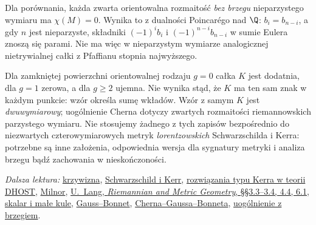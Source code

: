Dla porównania, każda zwarta orientowalna rozmaitość
\emph{bez brzegu} nieparzystego wymiaru ma $\chi(M)=0$.
Wynika to z dualności Poincarégo nad $\Q$:
$b_i=b_{n-i}$, a gdy $n$ jest nieparzyste,
składniki $(-1)^i b_i$ i $(-1)^{n-i}b_{n-i}$
w sumie Eulera znoszą się parami. Nie ma więc
w nieparzystym wymiarze analogicznej nietrywialnej
całki z Pfaffianu stopnia najwyższego.

\begin{uwaga}
Dla zamkniętej powierzchni orientowalnej rodzaju $g=0$
całka $K$ jest dodatnia, dla $g=1$ zerowa, a dla
$g\geq2$ ujemna. Nie wynika stąd, że $K$ ma ten sam
znak w każdym punkcie: wzór określa sumę wkładów.
Wzór z samym $K$ jest \emph{dwuwymiarowy};
uogólnienie Cherna dotyczy zwartych rozmaitości
riemannowskich parzystego wymiaru. Nie stosujemy
żadnego z tych zapisów bezpośrednio do niezwartych
czterowymiarowych metryk \emph{lorentzowskich}
Schwarzschilda i Kerra: potrzebne są inne założenia,
odpowiednia wersja dla sygnatury metryki i analiza brzegu
bądź zachowania w nieskończoności.
\end{uwaga}

\par\smallskip
{\footnotesize\noindent\emph{Dalsza lektura:}
\href{https://www.wim.uni-mannheim.de/media/Lehrstuehle/wim/schmidt/FSS2024/Riemannian_Geometry/Web/RGch5.html}{krzywizna},
\href{https://davidtong.org/pdfs/teaching/general-relativity/gr6.pdf}{Schwarzschild i Kerr},
\href{https://arxiv.org/pdf/2412.04135}{rozwiązania typu Kerra w teorii DHOST},
\href{https://math.stanford.edu/~ralph/math215b/Milnor.pdf}{Milnor},
\href{https://people.math.ethz.ch/~lang/RG.pdf}
{U.~Lang, \emph{Riemannian and Metric Geometry}, \S\S3.3--3.4, 4.4, 6.1},
\href{https://math.mit.edu/~lguth/Exposition/systmet.pdf}{skalar i małe kule},
\href{https://www.math.uchicago.edu/~may/REU2022/REUPapers/Hale.pdf}{Gauss--Bonnet},
\href{https://arxiv.org/pdf/1111.4972}{Cherna--Gaussa--Bonneta},
\href{https://pages.uoregon.edu/gilkey/P251-Gauss-Bonnet-v7a.pdf}{uogólnienie z brzegiem}.\par}
